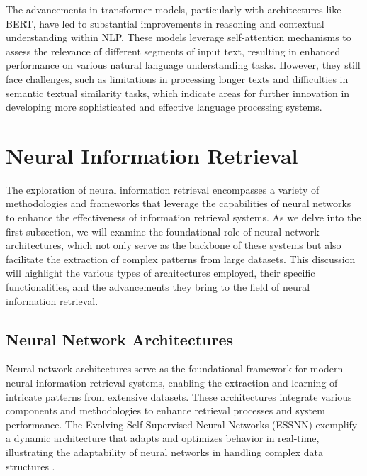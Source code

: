 The advancements in transformer models, particularly with architectures like BERT, have led to substantial improvements in reasoning and contextual understanding within NLP. These models leverage self-attention mechanisms to assess the relevance of different segments of input text, resulting in enhanced performance on various natural language understanding tasks. However, they still face challenges, such as limitations in processing longer texts and difficulties in semantic textual similarity tasks, which indicate areas for further innovation in developing more sophisticated and effective language processing systems. \cite{ginzburg2021selfsuperviseddocumentsimilarityranking,kasneci2023chatgpt}












\section{Neural Information Retrieval} \label{sec:Neural Information Retrieval}

 

The exploration of neural information retrieval encompasses a variety of methodologies and frameworks that leverage the capabilities of neural networks to enhance the effectiveness of information retrieval systems. As we delve into the first subsection, we will examine the foundational role of neural network architectures, which not only serve as the backbone of these systems but also facilitate the extraction of complex patterns from large datasets. This discussion will highlight the various types of architectures employed, their specific functionalities, and the advancements they bring to the field of neural information retrieval. 







\subsection{Neural Network Architectures} \label{subsec:Neural Network Architectures}

Neural network architectures serve as the foundational framework for modern neural information retrieval systems, enabling the extraction and learning of intricate patterns from extensive datasets. These architectures integrate various components and methodologies to enhance retrieval processes and system performance. The Evolving Self-Supervised Neural Networks (ESSNN) exemplify a dynamic architecture that adapts and optimizes behavior in real-time, illustrating the adaptability of neural networks in handling complex data structures \cite{le2019evolvingselfsupervisedneuralnetworks}. 



